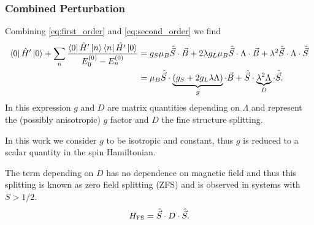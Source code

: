 \subsubsection{Combined Perturbation}
Combining \eqref{eq:first_order} and \eqref{eq:second_order} we find 
\begin{equation}
    \begin{align}
    \bra{0} \hat{H}' \ket{0}+  \sum_{n}\frac{\bra{0} \hat{H}' \ket{n} \bra{n} \hat{H'}\ket{0}}{E_0^{(0)} - E_n^{(0)}}
    &= g_S \mu_B \hat{\vec{S}} \cdot \vec{B} + 2\lambda g_L\mu_B\hat{\vec{S}}\cdot\Lambda\cdot\vec{B} + \lambda^2 \hat{\vec{S}}\cdot \Lambda \cdot \hat{\vec{S}} \\ 
    &=\mu_B \hat{\vec{S}} \cdot \underbrace{(g_S + 2g_L \lambda \Lambda)}_{g} \cdot \vec{B} + \hat{\vec{S}}\cdot \underbrace{\lambda^2 \Lambda}_{D} \cdot \hat{\vec{S}}.
    \end{align}
    \label{eq:}
\end{equation}
In this expression $g$ and $D$ are matrix quantities depending on $\Lambda$ and represent the (possibly anisotropic) $g$ factor and $D$ the fine structure splitting. 

In this work we consider $g$ to be isotropic and constant, thus $g$ is reduced to a scalar quantity in the spin Hamiltonian. 

The term depending on $D$ has no dependence on magnetic field and thus this  splitting is known as zero field splitting (ZFS) and is observed in systems with $S > 1/2$. 
\begin{equation}
    H_{\ce{FS}} = \hat{\vec{S}}\cdot D \cdot \hat{\vec{S}}. 
    \label{eq:fine_structure}
\end{equation}







